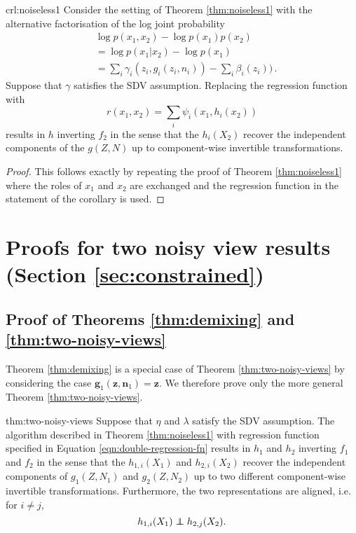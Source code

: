 \begin{repcorollary}{crl:noiseless1}
	Consider the setting of Theorem \ref{thm:noiseless1} with the alternative factorisation of the log joint probability
	\begin{align}
	&\log p({x}_1, {x}_2) - \log p({x}_1) p({x}_2) \nonumber \\
	&= \log p({x}_1 | {x}_2) - \log p({x}_1)\nonumber \\
	&= \sum_i \gamma_i(z_i, g_i(z_i, n_i)) - \sum_i \beta_i(z_i)) \,.
	\end{align}
	Suppose that ${\gamma}$ satisfies the SDV assumption.
	Replacing the regression function with
	\begin{equation*}
	r({x}_{1},{x}_{2})=\sum_{i}\psi_{i}({x}_{1}, h_{i}({x}_{2}))
	\end{equation*}
	results in ${h}$ inverting ${f}_2$ in the sense that the $h_{i}({X}_2)$ recover the independent components of the ${g}({Z}, {N})$ up  to component-wise invertible transformations.
\end{repcorollary}

\begin{proof}
	This follows exactly by repeating the proof of Theorem \ref{thm:noiseless1} where the roles of $x_1$ and ${x}_2$ are exchanged and the regression function in the statement of the corollary is used.
\end{proof}


\section{Proofs for two noisy view results (Section \ref{sec:constrained})}

\subsection{Proof of Theorems \ref{thm:demixing} and \ref{thm:two-noisy-views}}
\label{appendix:thm1}

Theorem \ref{thm:demixing} is a special case of Theorem \ref{thm:two-noisy-views} by considering the case $\bm{g}_1(\bm{z}, \bm{n}_1) = \bm{z}$.
We therefore prove only the more general Theorem \ref{thm:two-noisy-views}.

\medskip

\begin{reptheorem}{thm:two-noisy-views}
	Suppose that ${\eta}$ and ${\lambda}$ satisfy the SDV assumption.
	The algorithm described in Theorem \ref{thm:noiseless1} with regression function specified in Equation \ref{eqn:double-regression-fn} results in ${h}_1$ and ${h}_2$ inverting ${f}_1$ and ${f}_2$ in the sense that the $h_{1,i}({X}_1)$ and $h_{2,i}({X}_2)$ recover the independent components of ${g}_1({Z}, {N}_1)$ and ${g}_2({Z}, {N}_2)$ up to two different component-wise invertible transformations. Furthermore, the two representations are aligned, i.e. for $i\not=j$,
	\begin{equation*}
	h_{1,i}({X}_{1})\independent h_{2,j}({X}_{2}).
	\end{equation*}
\end{reptheorem}


